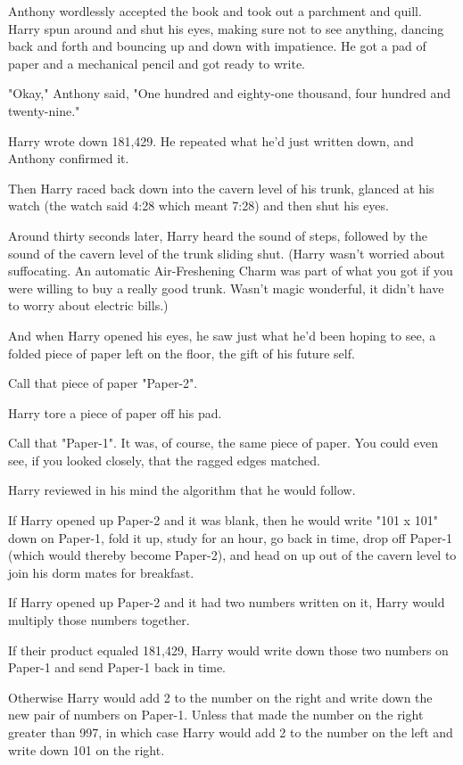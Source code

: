 Anthony wordlessly accepted the book and took out a parchment and quill. Harry 
spun around and shut his eyes, making sure not to see anything, dancing back 
and forth and bouncing up and down with impatience. He got a pad of paper and a 
mechanical pencil and got ready to write.

"Okay," Anthony said, "One hundred and eighty-one thousand, four hundred and 
twenty-nine."

Harry wrote down 181,429. He repeated what he'd just written down, and Anthony 
confirmed it.

Then Harry raced back down into the cavern level of his trunk, glanced at his 
watch (the watch said 4:28 which meant 7:28) and then shut his eyes.

Around thirty seconds later, Harry heard the sound of steps, followed by the 
sound of the cavern level of the trunk sliding shut. (Harry wasn't worried 
about suffocating. An automatic Air-Freshening Charm was part of what you got 
if you were willing to buy a really good trunk. Wasn't magic wonderful, it 
didn't have to worry about electric bills.)

And when Harry opened his eyes, he saw just what he'd been hoping to see, a 
folded piece of paper left on the floor, the gift of his future self.

Call that piece of paper "Paper-2".

Harry tore a piece of paper off his pad.

Call that "Paper-1". It was, of course, the same piece of paper. You could even 
see, if you looked closely, that the ragged edges matched.

Harry reviewed in his mind the algorithm that he would follow.

If Harry opened up Paper-2 and it was blank, then he would write "101 x 101" 
down on Paper-1, fold it up, study for an hour, go back in time, drop off 
Paper-1 (which would thereby become Paper-2), and head on up out of the cavern 
level to join his dorm mates for breakfast.

If Harry opened up Paper-2 and it had two numbers written on it, Harry would 
multiply those numbers together.

If their product equaled 181,429, Harry would write down those two numbers on 
Paper-1 and send Paper-1 back in time.

Otherwise Harry would add 2 to the number on the right and write down the new 
pair of numbers on Paper-1. Unless that made the number on the right greater 
than 997, in which case Harry would add 2 to the number on the left and write 
down 101 on the right.

